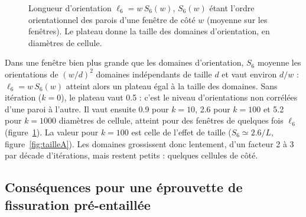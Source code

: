\documentclass[10pt,a4paper]{article}
\begin{document}
\begin{figure}[H]
  \centering
  \caption{Longueur d'orientation $\ell_6=w\,S_6(w)$, $S_6(w)$ étant l'ordre orientationnel des parois d'une fenêtre
    de côté $w$ (moyenne sur les fenêtres). Le plateau donne la taille des domaines d'orientation, en diamètres de
    cellule.}
  \label{fig:domaines}
\end{figure}

Dans une fenêtre bien plus grande que les domaines d'orientation, $S_6$ moyenne les orientations de
$(w/d)^2$ domaines indépendants de taille $d$ et vaut environ $d/w$ : $\ell_6=w\,S_6(w)$ atteint alors un plateau
égal à la taille des domaines. Sans itération ($k=0$), le plateau vaut 0.5 : c'est le niveau d'orientations non
corrélées d'une paroi à l'autre. Il vaut ensuite 0.9 pour $k=10$, 2.6 pour $k=100$ et 5.2 pour $k=1000$
diamètres de cellule, atteint pour des fenêtres de quelques fois $\ell_6$ (figure~\ref{fig:domaines}). La valeur
pour $k=100$ est celle de l'effet de taille ($S_6\simeq2.6/L$, figure~\ref{fig:tailleA}). Les domaines
grossissent donc lentement, d'un facteur 2 à 3 par décade d'itérations, mais restent petits : quelques
cellules de côté.

\subsection{Conséquences pour une éprouvette de fissuration pré-entaillée}
\end{document}
